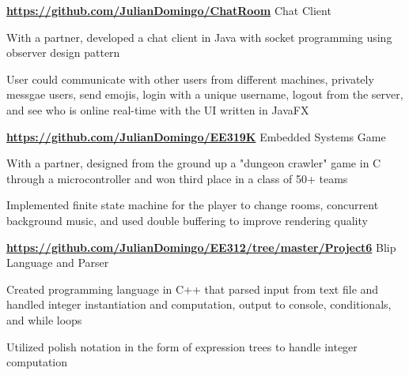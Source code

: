 \begin{cventries}
  \cventry
    {\normalsize \textbf{\url{https://github.com/JulianDomingo/ChatRoom}}}
    {\large Chat Client}
    {}
    {}
    {
      \begin{cvitems}
        \item {\normalsize With a partner, developed a chat client in Java with socket programming using observer design pattern}
        \item {\normalsize User could communicate with other users from different machines, privately messgae users, send emojis, login with a unique username, logout from the server, and see who is online real-time with the UI written in JavaFX}
      \end{cvitems}
    }
  \cventry
    {\normalsize \textbf{\url{https://github.com/JulianDomingo/EE319K}}}
    {\large Embedded Systems Game}
    {}
    {}
    {
      \begin{cvitems}
        \item {\normalsize With a partner, designed from the ground up a "dungeon crawler" game in C through a microcontroller and won third place in a class of 50+ teams}
        \item {\normalsize Implemented finite state machine for the player to change rooms, concurrent background music, and used double buffering to improve rendering quality}
      \end{cvitems}
    }
  \cventry
    {\normalsize \textbf{\url{https://github.com/JulianDomingo/EE312/tree/master/Project6}}}
    {\large Blip Language and Parser}
    {}
    {}
    {
      \begin{cvitems}
        \item {\normalsize Created programming language in C++ that parsed input from text file and handled integer instantiation and computation, output to console, conditionals, and while loops}
        \item {\normalsize Utilized polish notation in the form of expression trees to handle integer computation}
      \end{cvitems}
    }
\end{cventries}

